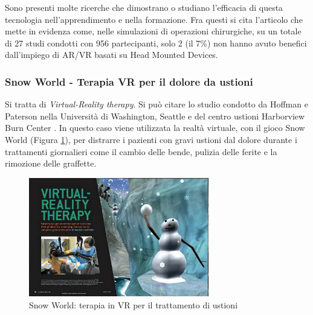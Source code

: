 Sono presenti molte ricerche che dimostrano o studiano l'efficacia di questa tecnologia nell'apprendimento e nella formazione. Fra questi si cita l'articolo \cite{HMDmedicalSeriousgame} che mette in evidenza come, nelle simulazioni di operazioni chirurgiche, su un totale di 27 studi condotti con 956 partecipanti, solo 2 (il 7\%) non hanno avuto benefici dall'impiego di AR/VR basati su Head Mounted Devices.

\subsubsection{Snow World - Terapia VR per il dolore da ustioni}
Si tratta di \textit{Virtual-Reality therapy}. Si può citare lo studio condotto da Hoffman e Paterson nella Università di Washington, Seattle e del centro ustioni Harborview Burn Center \cite{vrpain}. In questo caso viene utilizzata la realtà virtuale, con il gioco Snow World (Figura \ref{fig:snowworld}), per distrarre i pazienti con gravi ustioni dal dolore durante i trattamenti giornalieri come il cambio delle bende, pulizia delle ferite e la rimozione delle graffette.

\begin{figure} [h]
    \centering
    \includegraphics[width=0.7\textwidth]{img/snowworld.jpg}
    \caption{Snow World: terapia in VR per il trattamento di ustioni}
    \label{fig:snowworld}
\end{figure}

